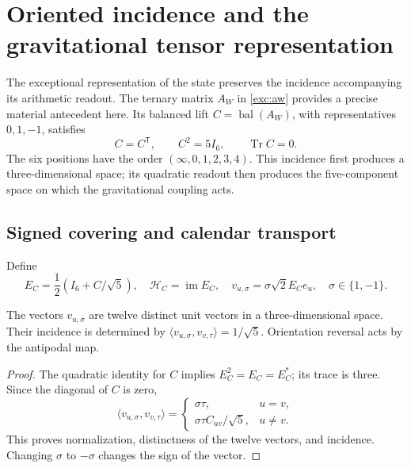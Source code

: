 \section{Oriented incidence and the gravitational tensor representation}
\label{vii:sec:pentacomponente}
The exceptional representation of the state preserves the incidence accompanying
its arithmetic readout. The ternary matrix \(A_W\) in
\eqref{exc:aw} provides a precise material antecedent here. Its
balanced lift \(C=\operatorname{bal}(A_W)\), with representatives
\(0,1,-1\), satisfies
\[
 C=C^{\mathsf T},\qquad C^2=5I_6,\qquad \operatorname{Tr}C=0.
\]
The six positions have the order \((\infty,0,1,2,3,4)\).
This incidence first produces a three-dimensional space; its quadratic
readout then produces the five-component space on which
the gravitational coupling acts.

\subsection{Signed covering and calendar transport}
Define
\[
 E_C=\frac12(I_6+C/\sqrt5),\quad
 \mathcal H_C=\operatorname{im}E_C,\quad
 v_{u,\sigma}=\sigma\sqrt2E_Ce_u,\quad \sigma\in\{1,-1\}.
\]
\begin{proposition}
\label{vii:prop:doce-orientadas}
The vectors \(v_{u,\sigma}\) are twelve distinct unit vectors
in a three-dimensional space. Their incidence is determined by
\(\langle v_{u,\sigma},v_{v,\tau}\rangle=1/\sqrt5\).
Orientation reversal acts by the antipodal map.
\end{proposition}
\begin{proof}
The quadratic identity for \(C\) implies \(E_C^2=E_C=E_C^*\);
its trace is three. Since the diagonal of \(C\) is zero,
\[
 \langle v_{u,\sigma},v_{v,\tau}\rangle
 =\begin{cases}\sigma\tau,&u=v,\\
 \sigma\tau C_{uv}/\sqrt5,&u\ne v.
 \end{cases}
\]
This proves normalization, distinctness of the twelve vectors, and incidence.
Changing \(\sigma\) to \(-\sigma\) changes the sign of the vector.
\end{proof}

